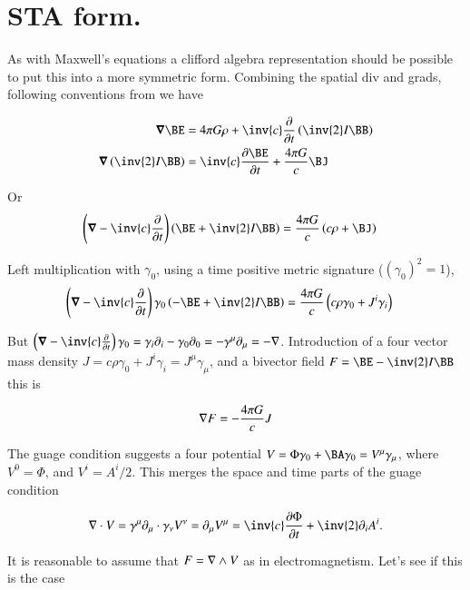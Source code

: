 \documentclass{article}
\begin{document}
\section{ STA form. }

As with Maxwell's equations a clifford algebra representation should be possible to put this into a more symmetric form.  Combining the spatial div and grads, following conventions from \cite{doran2003gap} we have

\begin{align}
\spacegrad \BE &= 4 \pi G \rho + \inv{c} \PD{t}{}\left(\inv{2}I \BB\right) \\
\spacegrad \left( \inv{2} I \BB \right) &= \inv{c} \PD{t}{\BE} + \frac{4\pi G}{c}\BJ
\end{align}

Or
\begin{align}
\left( \spacegrad -\inv{c} \PD{t}{}\right) \left( \BE + \inv{2} I \BB \right) &= \frac{4\pi G}{c} \left( c \rho + \BJ \right)
\end{align}

Left multiplication with $\gamma_0$, using a time positive metric signature ($(\gamma_0)^2=1$), 
\begin{align}
\left( \spacegrad -\inv{c} \PD{t}{}\right) \gamma_0 \left( -\BE + \inv{2} I \BB \right) &= \frac{4\pi G}{c} \left( c \rho \gamma_0 + J^i \gamma_i \right)
\end{align}

But $\left( \spacegrad -\inv{c} \PD{t}{}\right) \gamma_0 = \gamma_i \partial_i - \gamma_0 \partial_0 = -\gamma^\mu \partial_\mu = -\grad$.  Introduction of a four vector mass density $J = c\rho \gamma_0 + J^i \gamma_i = J^\mu \gamma_\mu$, and a bivector field $F = \BE -\inv{2} I \BB$ this is

\begin{align}
\nabla F = -\frac{4\pi G}{c} J
\end{align}

The guage condition suggests a four potential $V = \Phi \gamma_0 + \BA \gamma_0 = V^\mu \gamma_\mu$, where $V^0 = \Phi$, and $V^i = A^i/2$.  This merges the
space and time parts of the guage condition

\begin{align*}
\grad \cdot V = \gamma^\mu \partial_\mu \cdot \gamma_\nu V^\nu = \partial_\mu V^\mu = \inv{c}\PD{t}{\Phi} + \inv{2}\partial_i A^i.
\end{align*}

It is reasonable to assume that $F = \nabla \wedge V$ as in electromagnetism.  Let's see if this is the case
\end{document}
